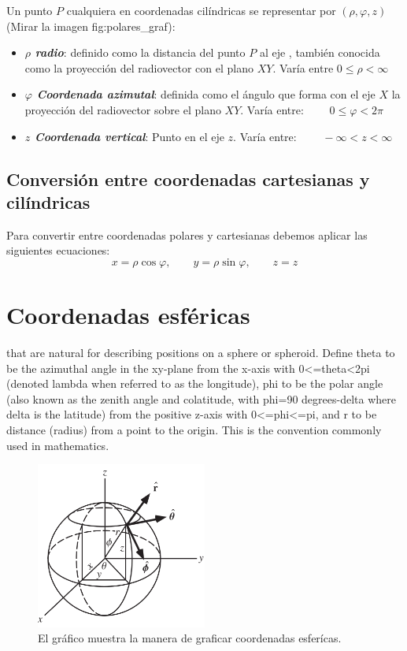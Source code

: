 \documentclass{article}
\begin{document}
Un punto $ P $ cualquiera en coordenadas cilíndricas se representar por $ (\rho ,\varphi ,z) $ (Mirar la imagen {fig:polares_graf}):

\begin{itemize}
  \item \textbf{\textit{$ \rho $ radio}}: definido como la distancia del punto $ P $ al eje $ $, también conocida como la proyección del radiovector con el plano $XY$. Varía entre $ 0\leq \rho <\infty  $
  \item \textbf{\textit{$ \varphi $ Coordenada azimutal}}: definida como el ángulo que forma con el eje $ X $ la proyección del radiovector sobre el plano $ XY $. Varía entre: $ \qquad 0\leq \varphi <2\pi $
  \item \textbf{\textit{$ z $ Coordenada vertical}}: Punto en el eje $z$. Varía entre: $  \qquad -\infty <z<\infty $
\end{itemize}


\subsection{Conversión entre coordenadas cartesianas y cilíndricas}
Para convertir entre coordenadas polares y cartesianas debemos aplicar las siguientes ecuaciones:
 $$ x=\rho \cos \varphi ,\qquad y=\rho \sin \varphi ,\qquad z=z $$


\section{Coordenadas esféricas}
that are natural for describing positions on a sphere or spheroid. Define theta to be the azimuthal angle in the xy-plane from the x-axis with 0<=theta<2pi (denoted lambda when referred to as the longitude), phi to be the polar angle (also known as the zenith angle and colatitude, with phi=90 degrees-delta where delta is the latitude) from the positive z-axis with 0<=phi<=pi, and r to be distance (radius) from a point to the origin. This is the convention commonly used in mathematics.

\begin{figure}[htp]
    \centering
    \includegraphics[width=0.5\textwidth]{spheric coord.svg}
    \caption{El gráfico muestra la manera de graficar coordenadas esferícas.}
    \label{fig:spheric_coord}
\end{figure}
\end{document}
